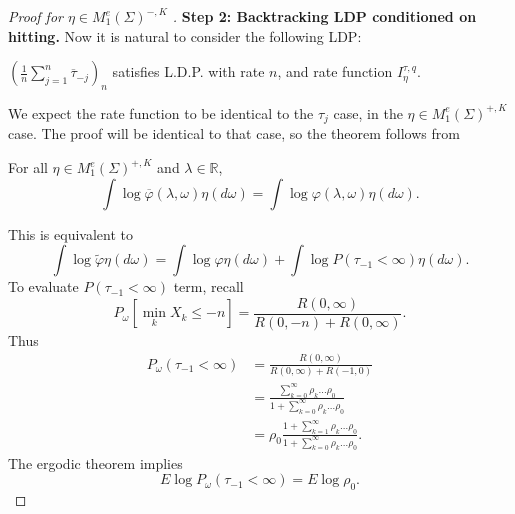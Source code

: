 \begin{proof}[Proof for $\eta \in M_1^e(\Sigma)^{-, K}$ ]
	\textbf{Step 2: Backtracking LDP conditioned on hitting.}
	Now it is natural to consider the following LDP:
	\begin{thm}[Theorem 6]
		$\left( \frac{1}{n} \sum_{j = 1}^n \overline{\tau} _{- j} \right) _n$ satisfies L.D.P. with rate $n$, and rate function $I_ \eta ^{\tau, q}$.
	\end{thm}
	We expect the rate function to be identical to the $\tau_j$ case, in the $\eta \in M_1^e(\Sigma)^{+, K}$ case.
	The proof will be identical to that case, so the theorem follows from
	\begin{lem}
		For all $\eta \in M_1^e(\Sigma)^{+, K}$ and $\lambda \in \mathbb{R}$,
		\[
			\int \log \overline{\varphi}(\lambda, \omega)  \eta(d \omega)
			= \int \log \varphi(\lambda, \omega) \eta(d \omega)
		.\] 
	\end{lem}

	This is equivalent to
	\[
		\int \log \tilde \varphi \eta(d \omega)
		= \int \log \varphi \eta(d \omega)
		+ \int  \log P(\tau_{-1} < \infty ) \eta(d \omega)
	.\] 
	To evaluate $P(\tau_{-1} < \infty )$ term, recall
	 \[
		P_\omega \left[ \min_k X_k \le - n \right] 
		= \frac{R(0, \infty )}{ R(0, -n) + R(0, \infty )}
	.\] 
	Thus
	\begin{align*}
		P_\omega(\tau_{-1} < \infty )
		&= \frac{R(0,\infty )}{R(0,\infty ) + R(-1, 0)}\\
		&= \frac{\sum_{k=0}^{\infty} \rho_k \ldots\rho_0 }{1 + \sum_{k=0}^{\infty} \rho_k \ldots\rho_0}\\
		&= \rho_0\frac{1 + \sum_{k=1}^{\infty} \rho_k \ldots\rho_0 }{1 + \sum_{k=0}^{\infty} \rho_k \ldots\rho_0}
	.\end{align*}
	The ergodic theorem implies
	\[
		E \log P_\omega(\tau_{-1} < \infty ) = E \log \rho_0
	.\] 


\end{proof}
